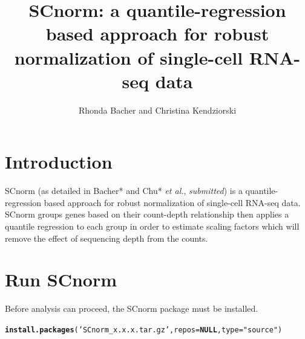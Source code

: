 \documentclass{article}\usepackage[]{graphicx}\usepackage[usenames,dvipsnames]{color}
\makeatletter
\newcommand{\hlstr}[1]{\textcolor[rgb]{0.192,0.494,0.8}{#1}}%
\newcommand{\hlstd}[1]{\textcolor[rgb]{0.345,0.345,0.345}{#1}}%
\newcommand{\hlkwa}[1]{\textcolor[rgb]{0.161,0.373,0.58}{\textbf{#1}}}%
\newcommand{\hlkwc}[1]{\textcolor[rgb]{0.333,0.667,0.333}{#1}}%
\newcommand{\hlkwd}[1]{\textcolor[rgb]{0.737,0.353,0.396}{\textbf{#1}}}%
\newenvironment{kframe}{%
 \def\at@end@of@kframe{}%
 \ifinner\ifhmode%
  \def\at@end@of@kframe{\end{minipage}}%
  \begin{minipage}{\columnwidth}%
 \fi\fi%
 \def\FrameCommand##1{\hskip\@totalleftmargin \hskip-\fboxsep
 \colorbox{shadecolor}{##1}\hskip-\fboxsep
     \hskip-\linewidth \hskip-\@totalleftmargin \hskip\columnwidth}%
 \MakeFramed {\advance\hsize-\width
   \@totalleftmargin\z@ \linewidth\hsize
   \@setminipage}}%
 {\par\unskip\endMakeFramed%
 \at@end@of@kframe}
\newenvironment{knitrout}{}{} %
\makeatother
\begin{document}
\title{SCnorm: a quantile-regression based approach for robust normalization of single-cell RNA-seq data}
\author{Rhonda Bacher and Christina Kendziorski}
\maketitle
\tableofcontents
\setcounter{tocdepth}{2}

\section{Introduction}
\label{sec:intro}
SCnorm (as detailed in Bacher* and Chu* {\it et al.}, {\it{submitted}}) 
is a quantile-regression based approach for robust normalization of 
single-cell RNA-seq data. SCnorm groups genes based on their count-depth relationship then applies a quantile regression to each group in order to estimate scaling factors which will remove the effect of sequencing depth from the counts. 

\section{Run SCnorm}
\label{sec:quickstart}
Before analysis can proceed, the SCnorm package must be installed.
\begin{knitrout}
\color{fgcolor}\begin{kframe}
\begin{alltt}
\hlkwd{install.packages}\hlstd{(}\hlstr{'SCnorm_x.x.x.tar.gz'}\hlstd{,} \hlkwc{repos}\hlstd{=}\hlkwa{NULL}\hlstd{,} \hlkwc{type}\hlstd{=}\hlstr{"source"}\hlstd{)}
\end{alltt}
\end{kframe}
\end{knitrout}
\end{document}
